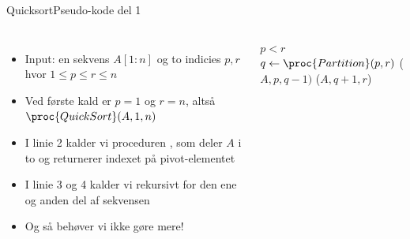 \documentclass[aspectratio=1610]{beamer}
\begin{document}
\begin{frame}{Quicksort}{Pseudo-kode del 1}
    \begin{columns}

        \begin{itemize}[<+->]
            \small
            \item Input: en sekvens $A[1:n]$ og to \alert{indicies} $p, r$ hvor
                $1 \leq p \leq r \leq n$
            \item Ved første kald er $p=1$ og $r=n$, altså
                $\proc{QuickSort}(A,1,n)$
            \item I linie 2 kalder vi proceduren , som deler $A$
                i to og returnerer indexet på pivot-elementet
            \item I linie 3 og 4 kalder vi rekursivt for den ene og anden
                del af sekvensen
            \item Og så behøver vi ikke gøre mere!
        \end{itemize}


        \begin{minipage}{\textwidth}
            \centering
            \begin{tcolorbox}

                \vspace{-\abovedisplayskip}
                \begin{codebox}
                    \li \If $p < r$ \Then
                    \li     $q \gets \proc{Partition}(p,r)$
                    \li     {}($A,p,q-1)$
                    \li     {}($A,q+1,r$)
                        \End
                \end{codebox}
            \end{tcolorbox}
        \end{minipage}
        
    \end{columns}
\end{frame}
\end{document}
